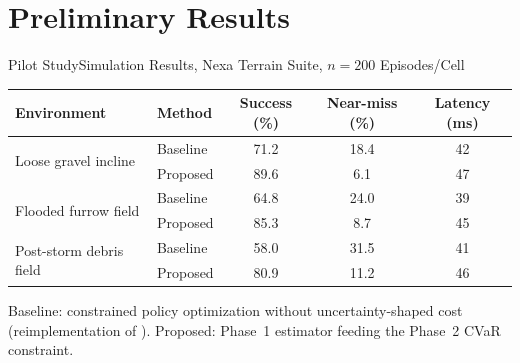 \section{Preliminary Results}

\begin{frame}{Pilot Study}{Simulation Results, Nexa Terrain Suite, $n=200$ Episodes/Cell}
  \begin{table}
    \centering
    \scriptsize
    \begin{tabular}{llccc}
      \toprule
      \textbf{Environment} & \textbf{Method} & \textbf{Success (\%)} & \textbf{Near-miss (\%)} & \textbf{Latency (ms)} \\
      \midrule
      \multirow{2}{*}{Loose gravel incline}
        & Baseline & 71.2 & 18.4 & 42 \\
        & \cellcolor{copper!14}Proposed & \cellcolor{copper!14}89.6 & \cellcolor{copper!14}6.1 & \cellcolor{copper!14}47 \\
      \midrule
      \multirow{2}{*}{Flooded furrow field}
        & Baseline & 64.8 & 24.0 & 39 \\
        & \cellcolor{copper!14}Proposed & \cellcolor{copper!14}85.3 & \cellcolor{copper!14}8.7 & \cellcolor{copper!14}45 \\
      \midrule
      \multirow{2}{*}{Post-storm debris field}
        & Baseline & 58.0 & 31.5 & 41 \\
        & \cellcolor{copper!14}Proposed & \cellcolor{copper!14}80.9 & \cellcolor{copper!14}11.2 & \cellcolor{copper!14}46 \\
      \bottomrule
    \end{tabular}
  \end{table}
  \par\vspace{6pt}
  \footnotesize Baseline: constrained policy optimization without
  uncertainty-shaped cost (reimplementation of \cite{osei2023constrained}).
  Proposed: Phase~1 estimator feeding the Phase~2 CVaR constraint.
\end{frame}

